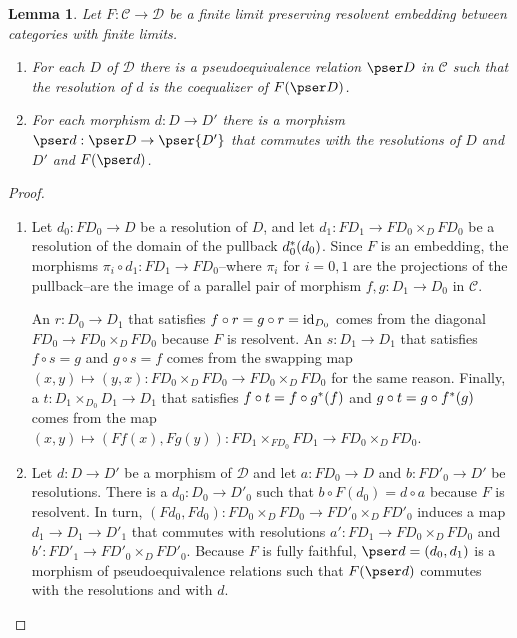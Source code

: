 \documentclass[sort&compress]{elsarticle}
\theoremstyle{plain}
\newtheorem{lemma}[theorem]{Lemma}
\theoremstyle{definition}
\theoremstyle{remark}
\newcommand\cat\mathcal
\newcommand\of:
\begin{document}
\begin{lemma} Let $F\of\cat C\to\cat D$ be a finite limit preserving resolvent embedding between categories with finite limits.
\begin{enumerate}
\item For each $D$ of $\cat D$ there is a pseudoequivalence relation $\pser D$ in $\cat C$ such that the resolution of $d$ is the coequalizer of $F(\pser D)$. 
\item For each morphism $d\of D\to D'$ there is a morphism $\pser d\of\pser D\to \pser{D'}$ that commutes with the resolutions of $D$ and $D'$ and $F(\pser d)$.
\end{enumerate}\label{induced psers}
\end{lemma}

\begin{proof} 
\begin{enumerate}
\item Let $d_0: FD_0\to D$ be a resolution of $D$, and let $d_1:FD_1 \to FD_0\times_DFD_0$ be a resolution of the domain of the pullback $d_0^*(d_0)$. Since $F$ is an embedding, the morphisms $\pi_i\circ d_1\of FD_1\to FD_0$--where $\pi_i$ for $i=0,1$ are the projections of the pullback--are the image of a parallel pair of morphism $f,g\of D_1 \to D_0$ in $\cat C$.

An $r:D_0\to D_1$ that satisfies $f\circ r = g\circ r = \mathrm{id}_{D_0}$ comes from the diagonal $FD_0 \to FD_0\times_DFD_0$ because $F$ is resolvent. An $s\of D_1\to D_1$ that satisfies $f\circ s = g$ and $g\circ s = f$ comes from the swapping map $(x,y)\mapsto(y,x)\of FD_0\times_DFD_0\to FD_0\times_DFD_0$ for the same reason. Finally, a $t\of D_1\times_{D_0} D_1\to D_1$ that satisfies $f\circ t = f\circ g^*(f)$ and $g\circ t = g\circ f^*(g)$ comes from the map $(x,y) \mapsto (Ff(x),Fg(y)) \of FD_1\times_{FD_0} FD_1\to FD_0\times_DFD_0$.

\item Let $d \of D\to D'$ be a morphism of $\cat D$ and let $a\of FD_0\to D$ and $b\of FD'_0\to D'$ be resolutions. There is a $d_0\of D_0\to D'_0$ such that $b\circ F(d_0) = d\circ a$ because $F$ is resolvent. In turn, $(Fd_0,Fd_0)\of FD_0\times_DFD_0\to FD'_0\times_DFD'_0$ induces a map $d_1\to D_1\to D'_1$ that commutes with resolutions $a'\of FD_1\to FD_0\times_DFD_0$ and $b'\of FD'_1\to FD'_0\times_DFD'_0$. Because $F$ is fully faithful, $\pser d = (d_0,d_1)$ is a morphism of pseudoequivalence relations such that $F(\pser d)$ commutes with the resolutions and with $d$.
\end{enumerate}
\end{proof}
\end{document}
